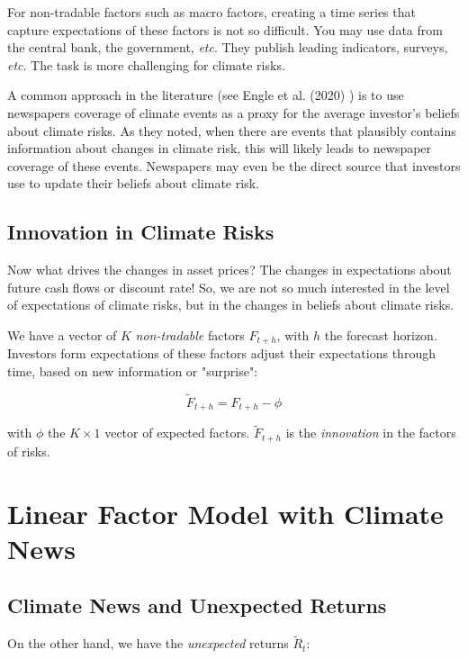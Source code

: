 For non-tradable factors such as macro factors, 
creating a time series that capture expectations 
of these factors is not so difficult. You may 
use data from the central bank, the government,
\textit{etc}. They publish leading indicators,
surveys, \textit{etc}. The task is more 
challenging for climate risks.

A common approach in the literature (see Engle et al. (2020) \cite{engle2020hedging})
is to use newspapers coverage of climate events as a proxy 
for the average investor's beliefs about climate risks.
As they noted, when there are events that plausibly
contains information about changes in climate risk,
this will likely leads to newspaper coverage of these events.
Newspapers may even be the direct source that investors
use to update their beliefs about climate risk.

\subsection{Innovation in Climate Risks}

Now what drives the changes in asset prices?
The changes in expectations about 
future cash flows or discount rate! So,
we are not so much interested in the level of
expectations of climate risks, but in the changes
in beliefs about climate risks.


We have a vector of $K$ \textit{non-tradable} factors $F_{t+h}$, with $h$ the 
forecast horizon. 
Investors form expectations of these factors 
adjust their expectations through time, based on new information or 
"surprise":

\begin{equation}
    \tilde{F}_{t+h} = F_{t+h} - \phi
\end{equation}

with $\phi$ the $K \times 1$ vector of expected factors.
$\tilde{F}_{t+h}$ is the \textit{innovation} in the factors of risks.




\section{Linear Factor Model with Climate News}


\subsection{Climate News and Unexpected Returns}

On the other hand, we have the \textit{unexpected} returns $\tilde{R}_t$:

